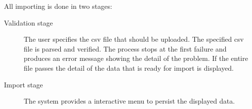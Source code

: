 All importing is  done in two stages:

\begin{description}
\item[Validation stage]

The user specifies the csv file that should be uploaded. The specified csv file is parsed and verified. The process stops at the first failure and produces an error message showing the detail of the problem. If the entire file passes the detail of the data that is ready for import is displayed.

\item[Import stage]
The system provides a interactive menu to persist the displayed data.
\end{description}